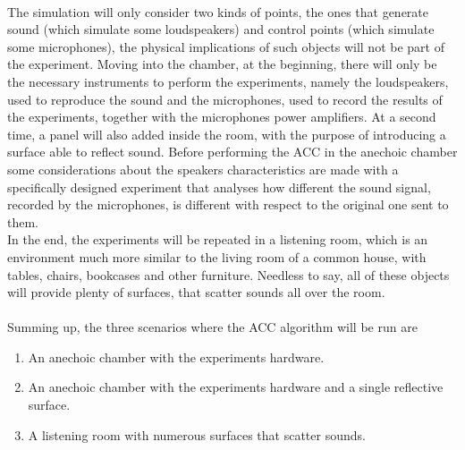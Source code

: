 \\
The simulation will only consider two kinds of points, the ones that generate sound (which simulate some loudspeakers) and control points (which simulate some microphones), the physical implications of such objects will not be part of the experiment. Moving into the chamber, at the beginning, there will only be the necessary instruments to perform the experiments, namely the loudspeakers, used to reproduce the sound and the microphones, used to record the results of the experiments, together with the microphones power amplifiers. At a second time, a panel will also added inside the room, with the purpose of introducing a surface able to reflect sound. Before performing the ACC in the anechoic chamber some considerations about the speakers characteristics are made with a specifically designed experiment that analyses how different the sound signal, recorded by the microphones, is different with respect to the original one sent to them.
\\
In the end, the experiments will be repeated in a listening room, which is an environment much more similar to the living room of a common house, with tables, chairs, bookcases and other furniture. Needless to say, all of these objects will provide plenty of surfaces, that scatter sounds all over the room.
\\
\\
Summing up, the three scenarios where the ACC algorithm will be run are

\begin{enumerate}
  \item An anechoic chamber with the experiments hardware. 
  \item An anechoic chamber with the experiments hardware and a single reflective surface.
  \item A listening room with numerous surfaces that scatter sounds.
\end{enumerate}

